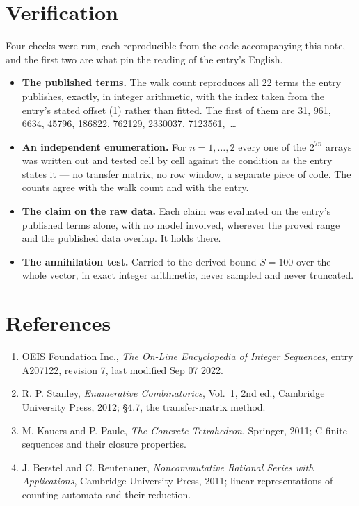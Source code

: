 \documentclass[11pt]{article}
\theoremstyle{definition}
\begin{document}
\section{Verification}

Four checks were run, each reproducible from the code accompanying this note, and the first two are what pin the reading of the entry's English.

\begin{itemize}

\item {\bfseries The published terms.} The walk count reproduces all 22 terms the entry publishes, exactly, in integer arithmetic, with the index taken from the entry's stated offset (1) rather than fitted. The first of them are 31, 961, 6634, 45796, 186822, 762129, 2330037, 7123561,~\dots

\item {\bfseries An independent enumeration.} For $n = 1,\dots,2$ every one of the $2^{7n}$ arrays was written out and tested cell by cell against the condition as the entry states it --- no transfer matrix, no row window, a separate piece of code. The counts agree with the walk count and with the entry.

\item {\bfseries The claim on the raw data.} Each claim was evaluated on the entry's published terms alone, with no model involved, wherever the proved range and the published data overlap. It holds there.

\item {\bfseries The annihilation test.} Carried to the derived bound $S = 100$ over the whole vector, in exact integer arithmetic, never sampled and never truncated.

\end{itemize}

\section{References}

\begin{enumerate}

\item OEIS Foundation Inc., \emph{The On-Line Encyclopedia of Integer Sequences}, entry \href{https://oeis.org/A207122}{A207122}, revision 7, last modified Sep 07 2022.

\item R. P. Stanley, \emph{Enumerative Combinatorics}, Vol.~1, 2nd ed., Cambridge University Press, 2012; \S4.7, the transfer-matrix method.

\item M. Kauers and P. Paule, \emph{The Concrete Tetrahedron}, Springer, 2011; C-finite sequences and their closure properties.

\item J. Berstel and C. Reutenauer, \emph{Noncommutative Rational Series with Applications}, Cambridge University Press, 2011; linear representations of counting automata and their reduction.

\end{enumerate}
\end{document}
